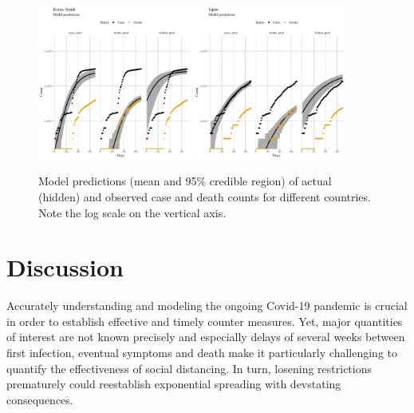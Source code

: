 \documentclass[a4paper]{tufte-handout}
\begin{document}
\begin{figure}
\begin{center}
    \includegraphics[width=0.45\textwidth]{../figs/model_pred_KOR.pdf}
    \includegraphics[width=0.45\textwidth]{../figs/model_pred_JPN.pdf}
  \end{center}
  \caption{\label{fig:modelpred} Model predictions (mean and 95\%
    credible region) of actual (hidden) and observed case and death
    counts for different countries. Note the log scale on the vertical
    axis.}
\end{figure}

\section{Discussion}
Accurately understanding and modeling the ongoing Covid-19 pandemic is
crucial in order to establish effective and timely counter
measures. Yet, major quantities of interest are not known precisely
and especially delays of several weeks between first infection,
eventual symptoms and death make it particularly challenging to
quantify the effectiveness of social distancing. In turn, losening
restrictions prematurely could reestablish exponential spreading with
devstating consequences.
\end{document}
